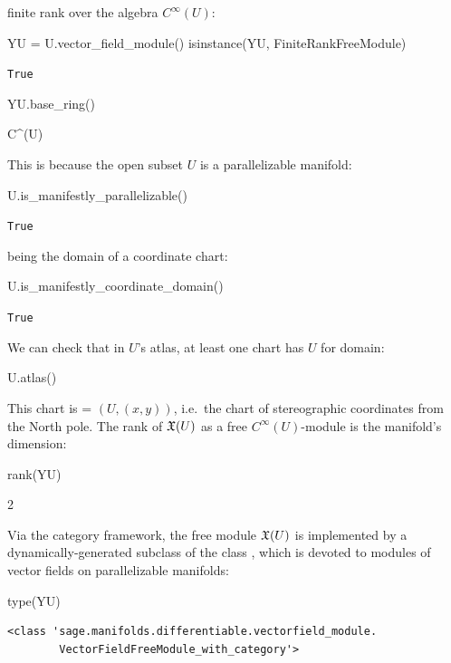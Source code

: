 finite rank over the algebra $C^\infty(U)$:
\begin{NBin}
YU = U.vector_field_module()
isinstance(YU, FiniteRankFreeModule)
\end{NBin}
\begin{NBout}
\texttt{True}
\end{NBout}
\vspace*{-\baselineskip}
\begin{NBin}
YU.base_ring()
\end{NBin}
\begin{NBoutM}
C^{\infty}\left(U\right)
\end{NBoutM}
This is because the open subset $U$ is a parallelizable manifold:
\begin{NBin}
U.is_manifestly_parallelizable()
\end{NBin}
\begin{NBout}
\texttt{True}
\end{NBout}
being the domain of a coordinate chart:
\begin{NBin}
U.is_manifestly_coordinate_domain()
\end{NBin}
\begin{NBout}
\texttt{True}
\end{NBout}
We can check that in $U$'s atlas, at least one chart has $U$ for domain:
\begin{NBin}
U.atlas()
\end{NBin}
\begin{NBoutM}
\end{NBoutM}
This chart is  = $(U, (x,y))$, i.e.\ the chart of stereographic coordinates
from the North pole.
The rank of $\mathfrak{X}(U)$ as a free $C^\infty(U)$-module is the manifold's dimension:
\begin{NBin}
rank(YU)
\end{NBin}
\begin{NBoutM}
2
\end{NBoutM}
Via the category framework,
the free module $\mathfrak{X}(U)$ is implemented by a dynamically-generated subclass
of the class , which is devoted to modules of vector fields
on parallelizable manifolds:
\begin{NBin}
type(YU)
\end{NBin}
\begin{NBout}
\begin{verbatim}
<class 'sage.manifolds.differentiable.vectorfield_module.
        VectorFieldFreeModule_with_category'>
\end{verbatim}
\end{NBout}
